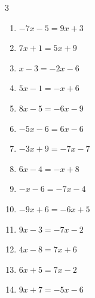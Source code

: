 \begin{multicols}{3}
\begin{enumerate}

\columnbreak %

  \item $-7x-5=9x+3$


  \item $7x+1=5x+9$

        \phantom{$\displaystyle x=4$}

  \item $x-3=-2x-6$

        \phantom{$\displaystyle x=-1$}

  \item $5x-1=-x+6$


  \item $8x-5=-6x-9$


  \item $-5x-6=6x-6$

        \phantom{$\displaystyle x=0$}

  \item $-3x+9=-7x-7$

        \phantom{$\displaystyle x=-4$}

  \item $6x-4=-x+8$


  \item $-x-6=-7x-4$


  \item $-9x+6=-6x+5$


  \item $9x-3=-7x-2$


  \item $4x-8=7x+6$


  \item $6x+5=7x-2$

        \phantom{$\displaystyle x=7$}

  \item $9x+7=-5x-6$


\end{enumerate}
\end{multicols}
